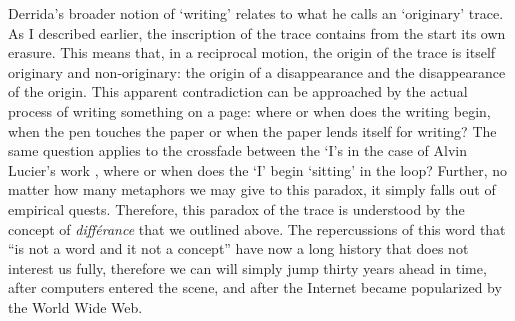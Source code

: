 Derrida's broader notion of `writing' relates to what he calls an `originary' trace. As I described earlier, the inscription of the trace contains from the start its own erasure. This means that, in a reciprocal motion, the origin of the trace is itself originary and non-originary: the origin of a disappearance and the disappearance of the origin. This apparent contradiction can be approached by the actual process of writing something on a page: where or when does the writing begin, when the pen touches the paper or when the paper lends itself for writing? The same question applies to the crossfade between the `I's in the case of Alvin Lucier's work , where or when does the `I' begin `sitting' in the loop? Further, no matter how many metaphors we may give to this paradox, it simply falls out of empirical quests. Therefore, this paradox of the trace is understood by the concept of \textit{différance} that we outlined above. The repercussions of this word that ``is not a word and it not a concept'' have now a long history that does not interest us fully, therefore we can will simply jump thirty years ahead in time, after computers entered the scene, and after the Internet became popularized by the World Wide Web.

